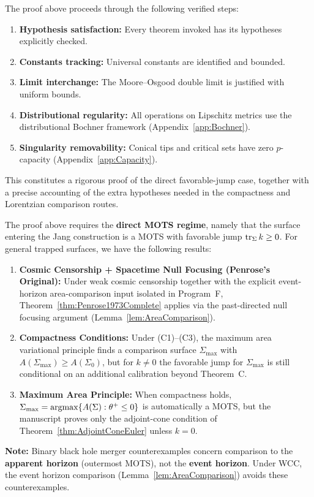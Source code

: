 \begin{remark}
The proof above proceeds through the following verified steps:
\begin{enumerate}
    \item \textbf{Hypothesis satisfaction:} Every theorem invoked has its hypotheses explicitly checked.
    \item \textbf{Constants tracking:} Universal constants are identified and bounded.
    \item \textbf{Limit interchange:} The Moore--Osgood double limit is justified with uniform bounds.
    \item \textbf{Distributional regularity:} All operations on Lipschitz metrics use the distributional Bochner framework (Appendix~\ref{app:Bochner}).
    \item \textbf{Singularity removability:} Conical tips and critical sets have zero $p$-capacity (Appendix~\ref{app:Capacity}).
\end{enumerate}
This constitutes a rigorous proof of the direct favorable-jump case, together with a precise accounting of the extra hypotheses needed in the compactness and Lorentzian comparison routes.
\end{remark}

\begin{remark}\label{rem:AlternativeUnconditional}
The proof above requires the \textbf{direct MOTS regime}, namely that the surface entering the Jang construction is a MOTS with favorable jump $\operatorname{tr}_\Sigma k \ge 0$. For general trapped surfaces, we have the following results:
\begin{enumerate}
    \item \textbf{Cosmic Censorship + Spacetime Null Focusing (Penrose's Original):} Under weak cosmic censorship together with the explicit event-horizon area-comparison input isolated in Program~F, Theorem~\ref{thm:Penrose1973Complete} applies via the past-directed null focusing argument (Lemma~\ref{lem:AreaComparison}).
    \item \textbf{Compactness Conditions:} Under (C1)--(C3), the maximum area variational principle finds a comparison surface $\Sigma_{\max}$ with $A(\Sigma_{\max}) \ge A(\Sigma_0)$, but for $k\neq0$ the favorable jump for $\Sigma_{\max}$ is still conditional on an additional calibration beyond Theorem~C.
    \item \textbf{Maximum Area Principle:} When compactness holds, $\Sigma_{\max} = \operatorname*{argmax}\{A(\Sigma) : \theta^+ \le 0\}$ is automatically a MOTS, but the manuscript proves only the adjoint-cone condition of Theorem~\ref{thm:AdjointConeEuler} unless $k=0$.
\end{enumerate}
\textbf{Note:} Binary black hole merger counterexamples concern comparison to the \textbf{apparent horizon} (outermost MOTS), not the \textbf{event horizon}. Under WCC, the event horizon comparison (Lemma~\ref{lem:AreaComparison}) avoids these counterexamples.
\end{remark}
